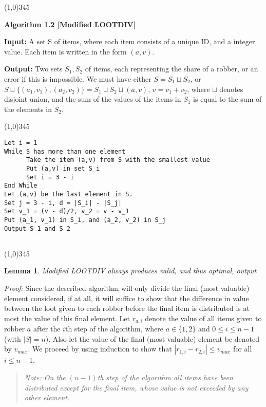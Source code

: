 \documentclass{article}
\newtheorem{lemma}[theorem]{Lemma}
\begin{document}
\begin{center}
\line(1,0){345}
\end{center}
\textbf{Algorithm 1.2 [Modified LOOTDIV]}

\textbf{Input:} A set S of items, where each item consists of a unique ID, and a integer value.  Each item is written in the form $(a,v)$.

\textbf{Output:} Two sets $S_1, S_2$ of items, each representing the share of a robber, or an error if this is impossible.  We must have either $S = S_1 \sqcup S_2$, or $S \sqcup \{(a_1, v_1),(a_2,v_2)\} = S_1 \sqcup S_2 \sqcup (a,v)$, $v = v_1 + v_2$, where $\sqcup$ denotes disjoint union, and the sum of the values of the items in $S_1$ is equal to the sum of the elements in $S_2$. 

\begin{center}
\line(1,0){345}
\end{center}

\begin{verbatim}
Let i = 1
While S has more than one element
      Take the item (a,v) from S with the smallest value
      Put (a,v) in set S_i
      Set i = 3 - i
End While
Let (a,v) be the last element in S.
Set j = 3 - i, d = |S_i| - |S_j|
Set v_1 = (v - d)/2, v_2 = v - v_1
Put (a_1, v_1) in S_i, and (a_2, v_2) in S_j
Output S_1 and S_2
   
\end{verbatim}

\begin{center}
\line(1,0){345}
\end{center}

\begin{lemma}
Modified LOOTDIV always produces valid, and thus optimal, output
\end{lemma}

\textit{Proof:} Since the described algorithm will only divide the final (most valuable) element considered, if at all, it will suffice to show that the difference in value between the loot given to each robber before the final item is distributed is at most the value of this final element. Let $r_{a, i}$ denote the value of all items given to robber $a$ after the $i$th step of the algorithm, where $a \in \{1, 2\}$ and $0 \leq i \leq n - 1$ (with $|S| = n$). Also let the value of the final (most valuable) element be denoted by $v_{max}$. We proceed by using induction to show that $|r_{1, i} - r_{2, i}| \leq v_{max}$ for all $i \leq n - 1$.
\begin{quote}
	\textit{Note: On the $(n - 1)$th step of the algorithm all items have been distributed except for the final item, whose value is not exceeded by any other element.}
\end{quote}
\end{document}
